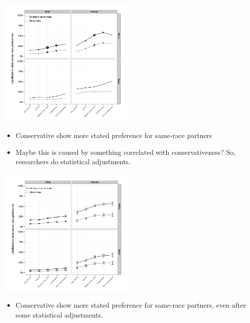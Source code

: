 \documentclass[aspectratio=169]{beamer}
\begin{document}
\begin{frame}

\begin{center}
\includegraphics[width=0.5\textwidth]{figures/anderson_political_2014_fig2_top}
\end{center}

\pause
\begin{itemize}
\item Conservative show more stated preference for same-race partners \pause
\item Maybe this is caused by something correlated with conservativeness?  So, researchers do statistical adjustments.
\end{itemize}

\end{frame}
\begin{frame}

\begin{center}
\includegraphics[width=0.5\textwidth]{figures/anderson_political_2014_fig2_bottom}
\end{center}

\pause
\begin{itemize}
\item Conservative show more stated preference for same-race partners, even after some statistical adjustments.
\end{itemize}

\end{frame}
\end{document}
